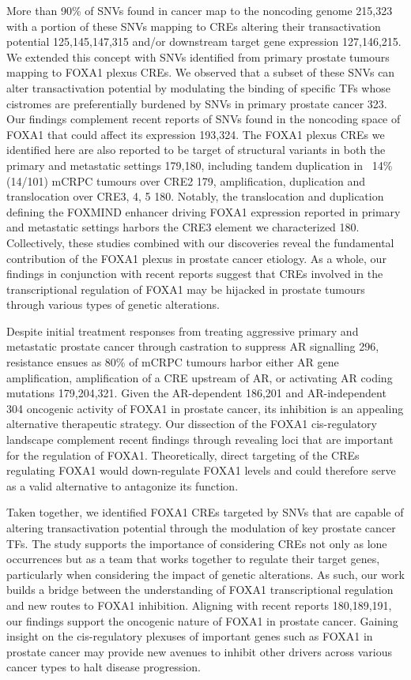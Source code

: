 More than 90\% of SNVs found in cancer map to the noncoding genome 215,323 with a portion of these SNVs mapping to CREs altering their transactivation potential 125,145,147,315 and/or downstream target gene expression 127,146,215.
We extended this concept with SNVs identified from primary prostate tumours mapping to FOXA1 plexus CREs.
We observed that a subset of these SNVs can alter transactivation potential by modulating the binding of specific TFs whose cistromes are preferentially burdened by SNVs in primary prostate cancer 323.
Our findings complement recent reports of SNVs found in the noncoding space of FOXA1 that could affect its expression 193,324.
The FOXA1 plexus CREs we identified here are also reported to be target of structural variants in both the primary and metastatic settings 179,180, including tandem duplication in ~14\% (14/101) mCRPC tumours over CRE2 179, amplification, duplication and translocation over CRE3, 4, 5 180.
Notably, the translocation and duplication defining the FOXMIND enhancer driving FOXA1 expression reported in primary and metastatic settings harbors the CRE3 element we characterized 180.
Collectively, these studies combined with our discoveries reveal the fundamental contribution of the FOXA1 plexus in prostate cancer etiology.
As a whole, our findings in conjunction with recent reports suggest that CREs involved in the transcriptional regulation of FOXA1 may be hijacked in prostate tumours through various types of genetic alterations.

Despite initial treatment responses from treating aggressive primary and metastatic prostate cancer through castration to suppress AR signalling 296, resistance ensues as 80\% of mCRPC tumours harbor either AR gene amplification, amplification of a CRE upstream of AR, or activating AR coding mutations 179,204,321.
Given the AR-dependent 186,201 and AR-independent 304 oncogenic activity of FOXA1 in prostate cancer, its inhibition is an appealing alternative therapeutic strategy.
Our dissection of the FOXA1 cis-regulatory landscape complement recent findings through revealing loci that are important for the regulation of FOXA1.
Theoretically, direct targeting of the CREs regulating FOXA1 would down-regulate FOXA1 levels and could therefore serve as a valid alternative to antagonize its function.

Taken together, we identified FOXA1 CREs targeted by SNVs that are capable of altering transactivation potential through the modulation of key prostate cancer TFs.
The study supports the importance of considering CREs not only as lone occurrences but as a team that works together to regulate their target genes, particularly when considering the impact of genetic alterations.
As such, our work builds a bridge between the understanding of FOXA1 transcriptional regulation and new routes to FOXA1 inhibition.
Aligning with recent reports 180,189,191, our findings support the oncogenic nature of FOXA1 in prostate cancer.
Gaining insight on the cis-regulatory plexuses of important genes such as FOXA1 in prostate cancer may provide new avenues to inhibit other drivers across various cancer types to halt disease progression.

